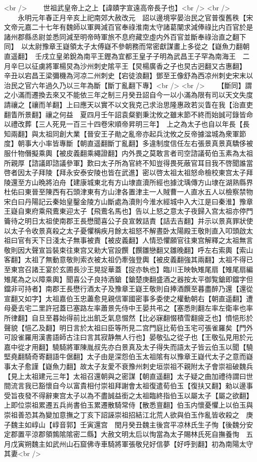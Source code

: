 <br />
　　世祖武皇帝上之上【諱賾字宣遠高帝長子也】<br />
<br />
　　永明元年春正月辛亥上祀南郊大赦改元　詔以邊境寜晏治民之官普復舊秩【宋文帝元嘉二十七年有魏師以軍興減百官奉祿淮南太守諸葛闡求減俸祿比内百官於是諸州郡縣丞尉並悉同減至明帝時軍旅不息府藏空虛内外百官並斷奉祿治直之翻下同】　以太尉豫章王嶷領太子太傅嶷不參朝務而常密獻謀畫上多從之【嶷魚力翻朝直遥翻】　壬戌立皇弟銳為南平王鏗為宜都王皇子子明為武昌王子罕為南海王　二月辛巳以征虜將軍楊炅為沙州刺史隂平王【炅楊廣香之子也炅古迥翻又古惠翻】　辛丑以宕昌王梁彌機為河凉二州刺史【宕徒浪翻】鄧至王像舒為西凉州刺史宋末以治民之官六年過久乃以三年為斷【斷丁亂翻下專】<br />
<br />
　　【斷同】謂之小滿而遷換去來又不能依三年之制三月癸丑詔自今一以小滿為限有司以天文失度請禳之【禳而羊翻】上曰應天以實不以文我克己求治思隆惠政若災眚在我【治直吏翻眚所景翻】禳之何益　夏四月壬午詔袁粲劉秉沈攸之雖末節不終而始誠可錄皆命以禮改葬【三人死見一百三十四卷宋順帝昇明三年】　上之為太子也自以年長【長知兩翻】與太祖同創大業【晉安王子勛之亂帝亦起兵沈攸之反帝據湓城為衆軍節度】朝事大小率皆專斷【朝直遥翻斷丁亂翻】多違制度信任左右張景真景真驕侈被服什物僭擬乘輿【被皮義翻乘繩證翻】内外畏之莫敢言者司空諮議荀伯玉素為太祖所親厚【諮議即諮議參軍】歎曰太子所為官終不知豈得畏死蔽官耳目我不啓聞誰當啓者因太子拜陵【拜永安泰安陵也皆在武進】密以啓太祖太祖怒命檢校東宫太子拜陵還至方山晩將泊舟【建康城東北有方山埭直瀆所經也據沈瑀傳方山埭在湖熟縣界杜佑曰東晉至陳西有石頭津東有方山津各置津主一人賊曹一人直水五人以檢察禁物宋白曰丹陽記云秦始皇鑿金陵方山斷處為瀆則今淮水經城中入大江是曰秦淮】豫章王嶷自東府乘飛鷰東迎太子【飛鷰名馬也】告以上怒之意太子夜歸入宫太祖亦停門籥待之明日太祖使南郡王長懋聞喜公子良宣敇詰責【詰去吉翻】并示以景真罪狀使以太子令收景真殺之太子憂懼稱疾月餘太祖怒不解晝卧太陽殿王敬則直入叩頭啟太祖曰官有天下日淺太子無事被責【被皮義翻】人情恐懼願官往東宫解釋之太祖無言敬則因大聲宣旨裝束往東宫又勑大官設饌【饌雛戀翻又雛晚翻】呼左右索輿【索山客翻】太祖了無動意敬則索衣被太祖仍牽強登輿【被皮義翻強其兩翻】太祖不得已至東宫召諸王宴於玄圃長沙王晃捉華蓋【捉亦執也】臨川王映執雉尾扇【雉尾扇編雉尾為之以障乘輿】聞喜公子良持酒鎗【鎗楚庚翻盛酒之器按太平御覧鎗即鐺字但鐺非可持者】南郡王長懋行酒太子及豫章王嶷王敬則自捧酒饌至暮盡醉乃還【還從宣翻又如字】太祖嘉伯玉忠藎愈見親信軍國密事多委使之權動朝右【朝直遥翻】遭母憂去宅二里許冠蓋已塞路左率蕭景先侍中王晏共弔之【塞悉則翻左率左衛率也率所律翻】自旦至暮始得前比出飢乏氣息惙然【比必寐翻惙積雪翻疲乏也】憤悒形於聲貌【悒乙及翻】明日言於太祖曰臣等所見二宫門庭比荀伯玉宅可張雀羅矣【門外可設雀羅用漢書語師古注曰言其寂静無人行也】晏敬弘之從子也【王敬弘見用於元嘉中從才用翻】驍騎將軍陳胤叔先亦白景真及太子得失而語太子皆云伯玉以聞【驍堅堯翻騎奇寄翻語牛倨翻】太子由是深怨伯玉太祖隂有以豫章王嶷代太子之意而嶷事太子愈謹【嶷魚力翻】故太子友愛不衰豫州刺史垣崇祖不親附太子會崇祖破魏兵【見上太祖建元三年】太祖召還朝與之密謀【朝直遥翻】太子疑之曲加禮待謂曰世間流言我已豁懷自今以富貴相付崇祖拜謝會太祖復遣荀伯玉【復扶又翻】勑以邊事受旨夜發不得辭東宫太子以為不盡誠益銜之太祖臨終指伯玉以屬太子【屬之欲翻】上即位崇祖累遷五兵尚書伯玉累遷散騎常侍【散悉亶翻】伯玉内懷憂懼上以伯玉與崇祖善恐其為變加意撫之丁亥下詔誣崇祖招結江北荒人欲與伯玉作亂皆收殺之　庚子魏主如崞山【崞音郭】壬寅還宫　閏月癸丑魏主後宫平凉林氏生子恂【後魏分安定郡置平涼郡領鶉隂隂密二縣】大赦文明太后以恂當為太子賜林氏死自撫養恂　五月戊寅朔魏主如武州山石窟佛寺車騎將軍張敬兒好信夢【好呼到翻】初為南陽太守其妻<br />

